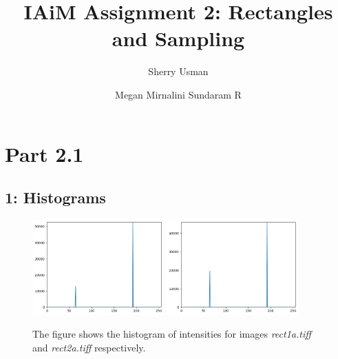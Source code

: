 \documentclass[runningheads]{llncs}
\begin{document}
\title{IAiM Assignment 2: Rectangles and Sampling}

\author{Sherry Usman\and Megan Mirnalini Sundaram R}
\maketitle   
\section*{Part 2.1}
\subsection*{1: Histograms}
\setlength{\intextsep}{5.0pt plus 2.0pt minus 2.0pt}

\begin{figure}[h!]
\centering
\includegraphics[width=0.45\textwidth]
{Report/Result_Images/histogram_a1.png}
\includegraphics[width=0.45\textwidth]
{Report/Result_Images/histogram_a2.png}
\caption{The figure shows the histogram of intensities for images \emph{rect1a.tiff} and \emph{rect2a.tiff} respectively. } \label{Histogram-1a&2a}
\end{figure}
\end{document}
